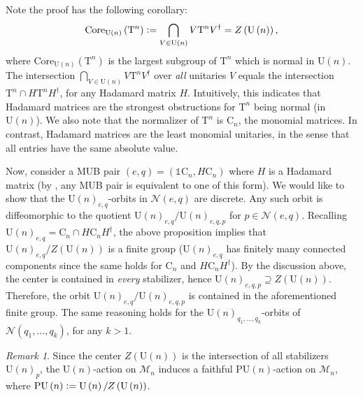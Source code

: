 \documentclass[referee,sn-mathphys-num]{sn-jnl}%
\theoremstyle{thmstyleone}%
\theoremstyle{thmstyletwo}%
\theoremstyle{remark}
\newtheorem*{remark*}{Remark}%
\theoremstyle{thmstylethree}%
\newcommand{\defeq}{\vcentcolon=}
\begin{document}
Note the proof has the following corollary:
\begin{equation}
	\mathrm{Core}_{\mathrm{U} \left( n \right)} \left( \mathrm{T}^n \right) \defeq \bigcap_{V \in \mathrm{U} \left( n \right)} V \mathrm{T}^n V^\dagger = Z \left( \mathrm{U} \left( n \right) \right) ,
\end{equation}
where $ \mathrm{Core}_{\mathrm{U} \left( n \right)} \left( \mathrm{T}^n \right) $ is the largest subgroup of $ \mathrm{T}^n $ which is normal in $ \mathrm{U} \left( n \right) $. The intersection $ \bigcap_{V \in \mathrm{U} \left( n \right)} V \mathrm{T}^n V^\dagger $ over \textit{all} unitaries $V$ equals the intersection $ \mathrm{T}^n \cap H \mathrm{T}^n H^\dagger $, for any Hadamard matrix $H$. Intuitively, this indicates that Hadamard matrices are the strongest obstructions for $ \mathrm{T}^n $ being normal (in $ \mathrm{U} \left( n \right) $). We also note that the normalizer of $ \mathrm{T}^n $ is $ \mathrm{C}_n $, the monomial matrices. In contrast, Hadamard matrices are the least monomial unitaries, in the sense that all entries have the same absolute value.

Now, consider a MUB pair $ \left( e, q \right) = \left( \mathds{1} \mathrm{C}_n, H \mathrm{C}_n \right) $ where $H$ is a Hadamard matrix (by , any MUB pair is equivalent to one of this form). We would like to show that the $ \mathrm{U} \left( n \right)_{e, q} $-orbits in $ \mathcal{N} \left( e, q \right) $ are discrete. Any such orbit is diffeomorphic to the quotient $ \mathrm{U} \left( n \right)_{e, q} / \mathrm{U} \left( n \right)_{e, q, p} $ for $ p \in \mathcal{N} \left( e, q \right) $.
Recalling $ \mathrm{U} \left( n \right)_{e, q} = \mathrm{C}_n \cap H \mathrm{C}_n H^\dagger $, the above proposition implies that $ \mathrm{U} \left( n \right)_{e, q} / Z \left( \mathrm{U} \left( n \right) \right) $ is a finite group ($ \mathrm{U} \left( n \right)_{e, q} $ has finitely many connected components since the same holds for $ \mathrm{C}_n $ and $ H \mathrm{C}_n H^\dagger $). %
By the discussion above, the center is contained in \textit{every} stabilizer, hence $ \mathrm{U} \left( n \right)_{e, q, p} \supseteq Z \left( \mathrm{U} \left( n \right) \right) $. Therefore, the orbit $ \mathrm{U} \left( n \right)_{e, q} / \mathrm{U} \left( n \right)_{e, q, p} $ is contained in the aforementioned finite group. The same reasoning holds for the $ \mathrm{U} \left( n \right)_{q_1, \ldots, q_k} $-orbits of $ \mathcal{N} \left( q_1, \ldots, q_k \right) $, for any $k > 1$.
\begin{remark*}
	Since the center $ Z \left( \mathrm{U} \left( n \right) \right) $ is the intersection of all stabilizers $ \mathrm{U} \left( n \right)_p $, the $ \mathrm{U} \left( n \right) $-action on $ \mathcal{M}_n $ induces a faithful $ \mathrm{PU} \left( n \right) $-action on $ \mathcal{M}_n $, where $ \mathrm{PU} \left( n \right) \defeq \mathrm{U} \left( n \right) / Z \left( \mathrm{U} \left( n \right) \right) $.
\end{remark*}
\end{document}
